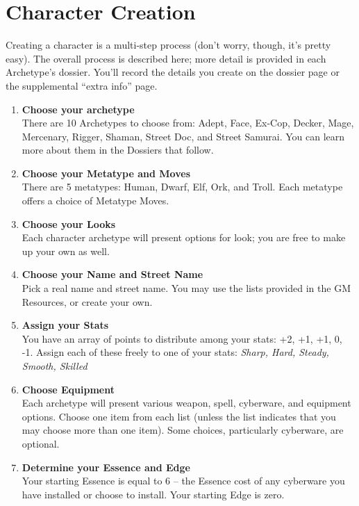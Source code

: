 \chapter{Character Creation}

Creating a character is a multi-step process (don’t worry, though, it’s pretty easy). The overall process is described here; more detail is provided in each Archetype’s dossier. You’ll record the details you create on the dossier page or the supplemental “extra info” page.

\begin{enumerate}
    \item \textbf{Choose your archetype} \\
    There are 10 Archetypes to choose from: Adept, Face, Ex-Cop, Decker, Mage, Mercenary, Rigger, Shaman, Street Doc, and Street Samurai. You can learn more about them in the Dossiers that follow.
    
    \item \textbf{Choose your Metatype and Moves} \\
    There are 5 metatypes: Human, Dwarf, Elf, Ork, and Troll. Each metatype offers a choice of Metatype Moves.
    
    \item \textbf{Choose your Looks} \\
    Each character archetype will present options for look; you are free to make up your own as well.
    
    \item \textbf{Choose your Name and Street Name} \\
    Pick a real name and street name. You may use the lists provided in the GM Resources, or create your own.
    
    \item \textbf{Assign your Stats} \\
    You have an array of points to distribute among your stats: +2, +1, +1, 0, -1. Assign each of these freely to one of your \refname{stats}: \textit{Sharp, Hard, Steady, Smooth, Skilled}
    
    \item \textbf{Choose Equipment} \\
    Each archetype will present various weapon, spell, cyberware, and equipment options. Choose one item from each list (unless the list indicates that you may choose more than one item). Some choices, particularly cyberware, are optional.
    
    \item \textbf{Determine your Essence and Edge} \\
    Your starting Essence is equal to 6 – the Essence cost of any cyberware you have installed or choose to install. Your starting Edge is zero.
    

\end{enumerate}
